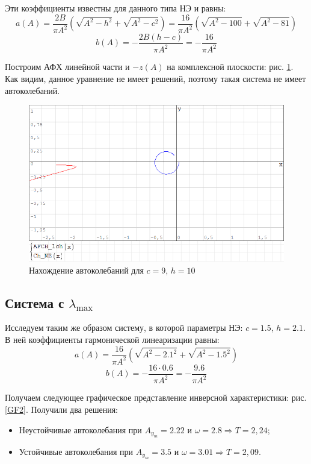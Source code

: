 	Эти коэффициенты известны для данного типа НЭ и равны:
	\begin{equation*}
		a(A) = \frac{2B}{\pi A^2}(\sqrt{A^2 - h^2} + \sqrt{A^2 - c^2}) = \frac{16}{\pi A^2}(\sqrt{A^2 - 100} + \sqrt{A^2 - 81})
	\end{equation*}
	\begin{equation*}
		b(A) = -\frac{2B(h-c)}{\pi A^2} = -\frac{16}{\pi A^2}
	\end{equation*}
	
	Построим АФХ линейной части и $-z(A)$ на комплексной плоскости: рис. \ref{GF1}. Как видим, данное уравнение не имеет решений, поэтому такая система не имеет автоколебаний.
	
	\begin{figure}[h]
		\centering\includegraphics[width=.7\textwidth]{png/GF1.png}
		\caption{Нахождение автоколебаний для $c=9$, $h=10$}
		\label{GF1}
	\end{figure}
	
	\subsection{Система с $\lambda_{\max}$}
	
	Исследуем таким же образом систему, в которой параметры НЭ: $c=1.5$, $h=2.1$. В ней коэффициенты гармонической линеаризации равны:
	\begin{equation*}
		a(A) = \frac{16}{\pi A^2}(\sqrt{A^2 - 2.1^2} + \sqrt{A^2 - 1.5^2})
	\end{equation*}
	\begin{equation*}
		b(A) = -\frac{16\cdot 0.6}{\pi A^2} = -\frac{9.6}{\pi A^2}
	\end{equation*}
	
	Получаем следующее графическое представление инверсной характеристики: рис. \ref{GF2}. Получили два решения:
	\begin{itemize}
		\item Неустойчивые автоколебания при $A_{y_m} = 2.22$ и $\omega = 2.8\Rightarrow T=2,24$;
		\item Устойчивые автоколебания при $A_{y_m} = 3.5$ и $\omega = 3.01\Rightarrow T=2,09$.
	\end{itemize}
	
